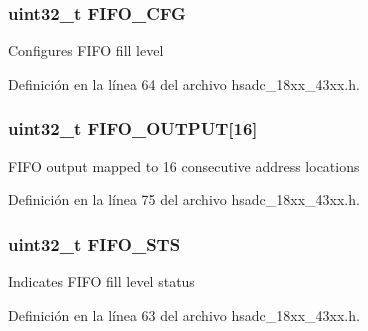 \subsubsection[{\texorpdfstring{F\+I\+F\+O\+\_\+\+C\+FG}{FIFO_CFG}}]{ uint32\+\_\+t F\+I\+F\+O\+\_\+\+C\+FG}\hypertarget{struct_l_p_c___h_s_a_d_c___t_ae7b9e6d15e87f6d9bbafc1dfa68e0c4e}{}\label{struct_l_p_c___h_s_a_d_c___t_ae7b9e6d15e87f6d9bbafc1dfa68e0c4e}
Configures F\+I\+FO fill level 

Definición en la línea 64 del archivo hsadc\+\_\+18xx\+\_\+43xx.\+h.

\subsubsection[{\texorpdfstring{F\+I\+F\+O\+\_\+\+O\+U\+T\+P\+UT}{FIFO_OUTPUT}}]{ uint32\+\_\+t F\+I\+F\+O\+\_\+\+O\+U\+T\+P\+UT\mbox{[}16\mbox{]}}\hypertarget{struct_l_p_c___h_s_a_d_c___t_a82fbcc2d59bed593c8aae343d1756d1e}{}\label{struct_l_p_c___h_s_a_d_c___t_a82fbcc2d59bed593c8aae343d1756d1e}
F\+I\+FO output mapped to 16 consecutive address locations 

Definición en la línea 75 del archivo hsadc\+\_\+18xx\+\_\+43xx.\+h.

\subsubsection[{\texorpdfstring{F\+I\+F\+O\+\_\+\+S\+TS}{FIFO_STS}}]{ uint32\+\_\+t F\+I\+F\+O\+\_\+\+S\+TS}\hypertarget{struct_l_p_c___h_s_a_d_c___t_a3a20d13547494126da81a3570cb32b21}{}\label{struct_l_p_c___h_s_a_d_c___t_a3a20d13547494126da81a3570cb32b21}
Indicates F\+I\+FO fill level status 

Definición en la línea 63 del archivo hsadc\+\_\+18xx\+\_\+43xx.\+h.

